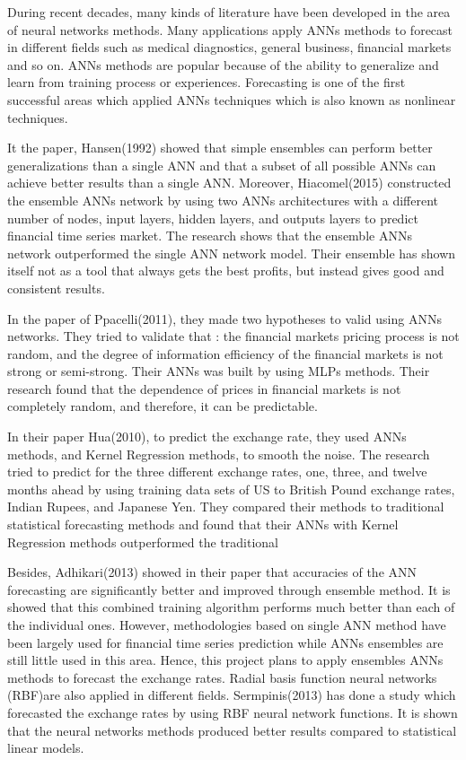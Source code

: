 \documentclass[journal]{IEEEtran}
\begin{document}
During recent decades, many kinds of literature have been developed in the area of neural networks methods. Many applications apply ANNs methods  to forecast in different fields such as medical diagnostics, general business, financial markets and so on. ANNs methods  are popular because of the ability to generalize and learn from training process or experiences. Forecasting is one of the first successful areas which applied ANNs techniques which is also known as nonlinear techniques. 

It the paper, Hansen(1992) showed that simple ensembles can perform better generalizations than a single ANN and that a subset of all possible ANNs can achieve better results than a single ANN. Moreover, Hiacomel(2015) constructed the ensemble ANNs network by using two ANNs  architectures  with a different number of nodes, input layers, hidden layers, and outputs layers to predict financial time series market. The research shows that the ensemble ANNs  network outperformed the single ANN network model. Their ensemble has shown itself not as a tool that always gets the best profits, but instead gives good and consistent results.


In the paper of Ppacelli(2011), they made two hypotheses to valid using ANNs networks. They tried to validate that : the financial markets pricing process  is not random, and the degree of information efficiency of the financial markets is not strong or semi-strong. Their ANNs was built by using MLPs methods. Their research found that the dependence of prices in financial markets is not completely random, and therefore, it can be predictable.

In their paper Hua(2010), to predict the exchange rate, they used ANNs methods, and Kernel Regression methods, to smooth the noise. The research tried to predict for the three different exchange rates, one, three, and twelve months ahead by using training data sets of US to British Pound exchange rates, Indian Rupees, and Japanese Yen. They compared their methods to traditional statistical forecasting methods and found that their ANNs with Kernel Regression methods outperformed the traditional

Besides, Adhikari(2013) showed in their paper that accuracies of the ANN forecasting are significantly better and improved  through ensemble method. It is  showed that this combined training algorithm performs much better than each of the individual ones. However, methodologies based on single ANN method have been largely used for financial time series prediction while ANNs ensembles are still little used in this area. Hence, this project plans to apply ensembles ANNs methods to forecast the exchange rates.
Radial basis function neural networks (RBF)are also applied in different fields. Sermpinis(2013) has done a study which forecasted the exchange rates by using RBF neural network functions. It is shown that the neural networks methods produced better results compared to statistical linear models.
\end{document}
